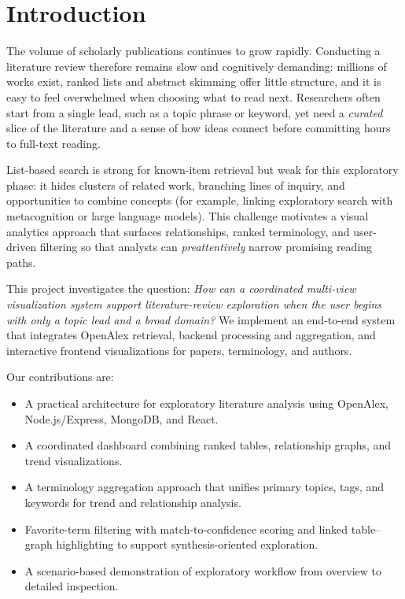\documentclass[sigconf]{acmart}
\begin{document}


\maketitle

\section{Introduction}
The volume of scholarly publications continues to grow rapidly. Conducting a literature review therefore remains slow and cognitively demanding: millions of works exist, ranked lists and abstract skimming offer little structure, and it is easy to feel overwhelmed when choosing what to read next. Researchers often start from a single lead, such as a topic phrase or keyword, yet need a \emph{curated} slice of the literature and a sense of how ideas connect before committing hours to full-text reading.

List-based search is strong for known-item retrieval but weak for this exploratory phase: it hides clusters of related work, branching lines of inquiry, and opportunities to combine concepts (for example, linking exploratory search with metacognition or large language models). This challenge motivates a visual analytics approach that surfaces relationships, ranked terminology, and user-driven filtering so that analysts can \emph{preattentively} narrow promising reading paths.

This project investigates the question: \textit{How can a coordinated multi-view visualization system support literature-review exploration when the user begins with only a topic lead and a broad domain?} We implement an end-to-end system that integrates OpenAlex retrieval, backend processing and aggregation, and interactive frontend visualizations for papers, terminology, and authors.

Our contributions are:
\begin{itemize}
  \item A practical architecture for exploratory literature analysis using OpenAlex, Node.js/Express, MongoDB, and React.
  \item A coordinated dashboard combining ranked tables, relationship graphs, and trend visualizations.
  \item A terminology aggregation approach that unifies primary topics, tags, and keywords for trend and relationship analysis.
  \item Favorite-term filtering with match-to-confidence scoring and linked table--graph highlighting to support synthesis-oriented exploration.
  \item A scenario-based demonstration of exploratory workflow from overview to detailed inspection.
\end{itemize}
\end{document}
